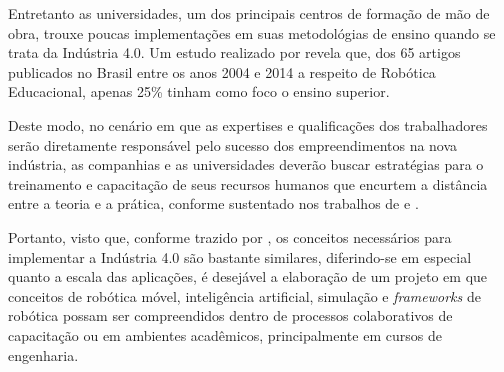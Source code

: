 Entretanto as universidades, um dos principais centros de formação de mão de obra, trouxe poucas implementações em suas metodológias de ensino quando se trata da Indústria 4.0. Um estudo realizado por  revela que, dos 65 artigos publicados no Brasil entre os anos 2004 e 2014 a respeito de Robótica Educacional, apenas 25\% tinham como foco o ensino superior.
    
Deste modo, no cenário em que as expertises e qualificações dos trabalhadores serão diretamente responsável pelo sucesso dos empreendimentos na nova indústria, as companhias e as universidades deverão buscar estratégias para o treinamento e capacitação de seus recursos humanos que encurtem a distância entre a teoria e a prática, conforme sustentado nos trabalhos de \cite{Benesova2017} e \cite{Gonzalez2018}.

Portanto, visto que, conforme trazido por \cite{Khomchenko2018}, os conceitos necessários para implementar a Indústria 4.0 são bastante similares, diferindo-se em especial quanto a escala das aplicações, é desejável a elaboração de um projeto em que conceitos de robótica móvel, inteligência artificial, simulação e \textit{frameworks} de robótica possam ser compreendidos dentro de processos colaborativos de capacitação ou em ambientes acadêmicos, principalmente em cursos de engenharia.       

\begin{comment}
\section{Organização do trabalho}
\label{section:organizacao}

Este documento apresenta $5$ capítulos e está estruturado da seguinte forma:

\begin{itemize}

  \item \textbf{Capítulo \ref{chap:intro} - Introdução}: Contextualiza o âmbito, no qual a pesquisa proposta está inserida. Apresenta, portanto, a definição do problema, objetivos e justificativas da pesquisa e como este \thetypeworkthree está estruturado;
  \item \textbf{Capítulo \ref{chap:fundteor} - Fundamentação Teórica}: XXX;
  \item \textbf{Capítulo \ref{chap:mat} - Materiais e Métodos}: XXX;
  \item \textbf{Capítulo \ref{chap:result} - Resultados}: XXX;
  \item \textbf{Capítulo \ref{chap:conc} - Conclusão}: Apresenta as conclusóes, contribuições e algumas sugestões de atividades de pesquisa a serem desenvolvidas no futuro.

\end{itemize}
\end{comment}
